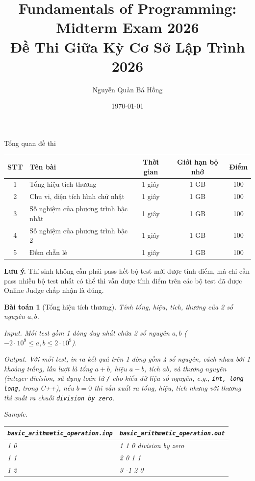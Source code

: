 \documentclass[12pt]{article}
\title{Fundamentals of Programming: Midterm Exam 2026\\Đề Thi Giữa Kỳ Cơ Sở Lập Trình 2026}
\author{Nguyễn Quản Bá Hồng}
\date{\today}
\newtheorem{baitoan}{Bài toán}
\begin{document}
\maketitle

\begin{center}
    \Large
    Tổng quan đề thi
\end{center}

\begin{table}[H]
    \small
    \centering
    \begin{tabular}{|c|l|c|c|c|}
        \hline
        {\bf STT} & {\bf Tên bài} & {\bf Thời gian} & {\bf Giới hạn bộ nhớ} & {\bf Điểm} \\
        \hline
        1 & Tổng hiệu tích thương & 1 giây & 1 GB & 100 \\
        \hline
        2 & Chu vi, diện tích hình chữ nhật & 1 giây & 1 GB & 100 \\
        \hline
        3 & Số nghiệm của phương trình bậc nhất & 1 giây & 1 GB & 100 \\
        \hline
        4 & Số nghiệm của phương trình bậc 2 & 1 giây & 1 GB & 100 \\
        \hline
        5 & Đếm chẵn lẻ & 1 giây & 1 GB & 100 \\
        \hline
    \end{tabular}
\end{table}
{\bf Lưu ý.} Thí sinh không cần phải pass hết bộ test mới được tính điểm, mà chỉ cần pass nhiều bộ test nhất có thể thì vẫn được tính điểm trên các bộ test đã được Online Judge chấp nhận là đúng.

\begin{baitoan}[Tổng hiệu tích thương]
    Tính tổng, hiệu, tích, thương của 2 số nguyên $a,b$.
    \item {\sf Input.} Mỗi test gồm 1 dòng duy nhất chứa 2 số nguyên $a,b$ ($-2\cdot10^9\le a,b\le2\cdot10^9$).
    \item {\sf Output.} Với mỗi test, in ra kết quả trên 1 dòng gồm 4 số nguyên, cách nhau bởi 1 khoảng trắng, lần lượt là tổng $a + b$, hiệu $a - b$, tích $ab$, và thương nguyên (integer division, sử dụng toán tử {\tt/} cho kiểu dữ liệu số nguyên, e.g., {\tt int, long long}, trong {\sf C++}), nếu $b = 0$ thì vẫn xuất ra tổng, hiệu, tích nhưng với thương thì xuất ra chuỗi {\tt division by zero}.
    \item {\sf Sample.}
    \begin{table}[H]
        \centering
        \begin{tabular}{|l|l|}
            \hline
            \verb|basic_arithmetic_operation.inp| & \verb|basic_arithmetic_operation.out| \\
            \hline
            1 0 & 1 1 0 division by zero \\
            \hline
            1 1 & 2 0 1 1\\
            \hline
            1 2 & 3 -1 2 0\\
            \hline
        \end{tabular}
    \end{table}
\end{baitoan}
\end{document}
